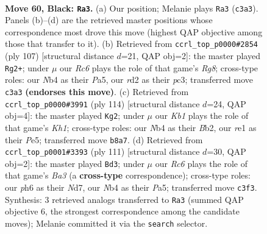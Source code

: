 \documentclass[11pt]{article}
\begin{document}
\clearpage

\begin{figure}[p]\centering
\begin{subfigure}{0.46\textwidth}\centering
\resizebox{\linewidth}{!}{%
\newchessgame
\chessboard[
  setfen={1k6/1p5p/6pP/p4p2/1n3P2/2r5/3R3K/4R3 b - - 8 60},
  showmover=false,
  pgfstyle=straightmove, color=movearrow, markmove={c3-a3}
]}
\caption{}
\end{subfigure}\hfill
\begin{subfigure}{0.46\textwidth}\centering
\resizebox{\linewidth}{!}{%
\newchessgame
\chessboard[
  setfen={8/7R/1P1kp1p1/p4p2/P7/2P5/K7/6r1 b - - 12 54},
  showmover=false,
  pgfstyle=straightmove, color=movearrow, markmove={g1-g2}
]}
\caption{}
\end{subfigure}
\\[4pt]
\begin{subfigure}{0.46\textwidth}\centering
\resizebox{\linewidth}{!}{%
\newchessgame
\chessboard[
  setfen={4b3/r5k1/3R4/4Pp2/5Pp1/6P1/1B6/7K w - - 0 58},
  showmover=false,
  pgfstyle=straightmove, color=movearrow, markmove={h1-g2}
]}
\caption{}
\end{subfigure}\hfill
\begin{subfigure}{0.46\textwidth}\centering
\resizebox{\linewidth}{!}{%
\newchessgame
\chessboard[
  setfen={k7/2pn1P2/bp1p4/p2P3P/P2N4/6K1/8/8 b - - 0 56},
  showmover=false,
  pgfstyle=straightmove, color=movearrow, markmove={a6-d3}
]}
\caption{}
\end{subfigure}
\caption{\textbf{Move 60, Black: \texttt{Ra3}.} (a) Our position; Melanie plays \texttt{Ra3} (\texttt{c3a3}). Panels (b)--(d) are the retrieved master positions whose correspondence most drove this move (highest QAP objective among those that transfer to it). (b) Retrieved from \texttt{ccrl\_top\_p0000\#2854} (ply 107) [structural distance $d$=21, QAP obj=2]: the master played \texttt{Rg2+}; under $\mu$ our \emph{Rc6} plays the role of that game's \emph{Rg8}; cross-type roles: our \emph{N}b4 as their \emph{P}a5, our \emph{r}d2 as their \emph{p}c3; transferred move \texttt{c3a3} \textbf{(endorses this move)}. (c) Retrieved from \texttt{ccrl\_top\_p0000\#3991} (ply 114) [structural distance $d$=24, QAP obj=4]: the master played \texttt{Kg2}; under $\mu$ our \emph{Kb1} plays the role of that game's \emph{Kh1}; cross-type roles: our \emph{N}b4 as their \emph{B}b2, our \emph{r}e1 as their \emph{P}e5; transferred move \texttt{b8a7}. (d) Retrieved from \texttt{ccrl\_top\_p0001\#3393} (ply 111) [structural distance $d$=30, QAP obj=2]: the master played \texttt{Bd3}; under $\mu$ our \emph{Rc6} plays the role of that game's \emph{Ba3} (a \textbf{cross-type} correspondence); cross-type roles: our \emph{p}h6 as their \emph{N}d7, our \emph{N}b4 as their \emph{P}a5; transferred move \texttt{c3f3}. Synthesis: 3 retrieved analogs transferred to \texttt{Ra3} (summed QAP objective 6, the strongest correspondence among the candidate moves); Melanie committed it via the \texttt{search} selector.}
\label{fig:thought-m119}
\end{figure}
\end{document}
